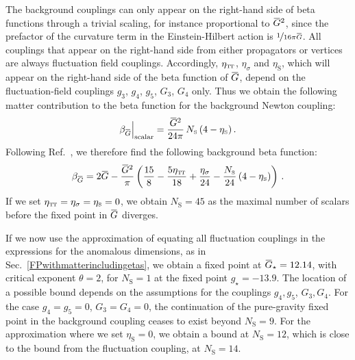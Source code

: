 \documentclass[11pt]{book}
\newcommand{\overbar}[1]{\mkern 1.5mu\overline{\mkern-1.5mu#1\mkern-1.5mu}\mkern 1.5mu}
\newcommand\TTspace{ -1pt }
\newcommand\etaTT{ \eta_{\scriptscriptstyle{\mathrm{T\hspace{\TTspace}T}}} }
\newcommand\etaS{ \eta_{\scriptscriptstyle{\mathrm{S}}} }
\newcommand\NS{ N_{\scriptscriptstyle{\mathrm{S}}} }
\newcommand\Gback{ \overbar{G} } %
\numberwithin{equation}{chapter}
\begin{document}
The background couplings can only appear on the right-hand side of beta functions through a trivial scaling,
for instance proportional to $\Gback^2$, since the prefactor of the curvature term in the Einstein-Hilbert
action is $\nicefrac{1}{16 \pi \Gback}$.
All couplings that appear on the right-hand side from either propagators or vertices are always
fluctuation field couplings.
Accordingly, $\etaTT$, $\eta_{\sigma}$ and $\etaS$,
which will appear on the right-hand side of the beta function of $\Gback$,
depend on the fluctuation-field couplings $g_3$, $g_4$, $g_5$, $G_3$, $G_4$ only.
Thus we obtain the following matter contribution to the beta function for the background Newton coupling:
\begin{align}
  \beta_{\Gback} \Big|_{\rm scalar} = \frac{\Gback^2}{24 \pi} \, \NS \, (4-\etaS) \,.
\end{align}
Following Ref.~\cite{Percacci:2015wwa}, we therefore find the following background beta function:
\begin{align}
  \beta_{\Gback} = 2 \Gback
    - \frac{\Gback^2}{\pi}
  \left(
      \frac{15}{8}
    - \frac{5\etaTT}{18}
    + \frac{\eta_{\sigma}}{24}
    -  \frac{\NS}{24} \, (4 - \etaS)
  \right) \,.
\end{align}
If we set $\etaTT = \eta_{\sigma} = \etaS = 0$, we obtain $\NS=45$ as the maximal
number of scalars before the fixed point in $\Gback$ diverges.

If we now use the approximation of equating all fluctuation couplings in the expressions
for the anomalous dimensions, as in Sec.~\ref{FPwithmatterincludingetas},
we obtain a fixed point at $\Gback_{\star}=12.14$, with critical exponent $\theta=2$,
for $\NS=1$ at the fixed point $g_{\star}=-13.9$.
The location of a possible bound depends on the assumptions for the couplings $g_4, g_5$, $G_3, G_4$.
For the case $g_4 = g_5 = 0$, $G_3 = G_4 = 0$,
the continuation of the pure-gravity fixed point in the background coupling ceases to exist beyond $\NS=9$.
For the approximation where we set $\etaS = 0$, we obtain a bound at $\NS=12$,
which is close to the bound from the fluctuation coupling, at $\NS=14$.
\end{document}
